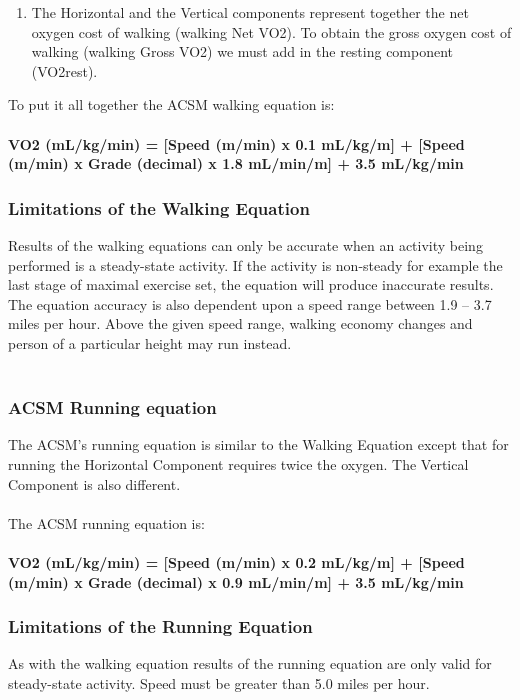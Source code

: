 \documentclass[12pt, a4paper]{report}   %
\begin{document}
\begin{enumerate}
\begin{enumerate}
	\item The Horizontal and the Vertical components represent together the net oxygen cost of walking (walking Net VO2). To obtain the gross oxygen cost of walking (walking Gross VO2) we must add in the resting component (VO2rest).
\end{enumerate}
To put it all together the ACSM walking equation is:\\ \\
\textbf{VO2 (mL/kg/min) = [Speed (m/min) x 0.1 mL/kg/m] +
          [Speed (m/min) x Grade (decimal) x 1.8 mL/min/m] +
          3.5 mL/kg/min}\\


\subsubsection{Limitations of the Walking Equation}
Results of the walking equations can only be accurate when an activity being performed is a steady-state activity. If the activity is non-steady for example the last stage of maximal exercise set, the equation will produce inaccurate results. The equation accuracy is also dependent upon a speed range between 1.9 – 3.7 miles per hour. Above the given speed range, walking economy changes and person of a particular height may run instead.\\ \\


\clearpage
\subsubsection{ACSM Running equation}
The ACSM's running equation is similar to the Walking Equation except that for running the Horizontal Component requires twice the oxygen. The Vertical Component is also different.\\ \\
The ACSM running equation is:\\ \\
\textbf{VO2 (mL/kg/min) = [Speed (m/min) x 0.2 mL/kg/m] +
          [Speed (m/min) x Grade (decimal) x 0.9 mL/min/m] +
          3.5 mL/kg/min}

\subsubsection{Limitations of the Running Equation}
As with the walking equation results of the running equation are only valid for steady-state activity. Speed must be greater than 5.0 miles per hour.\\


\end{enumerate}
\end{document}
